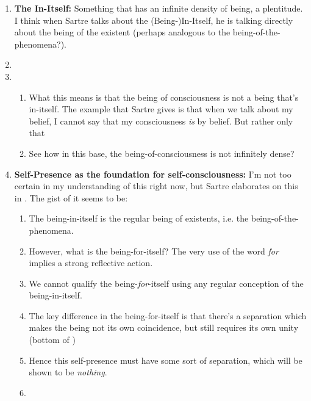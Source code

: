 \begin{enumerate}
  \item \textbf{The In-Itself:} Something that has an infinite density of being, a plentitude. I think when Sartre talks about the (Being-)In-Itself, he is talking directly about the being of the existent (perhaps analogous to the being-of-the-phenomena?).
  \item {}
  \item {}
  \begin{enumerate}
    \item What this means is that the being of consciousness is not a being that's in-itself. The example that Sartre gives is that when we talk about my belief, I cannot say that my consciousness \emph{is} by belief. But rather only that 
    \item See how in this base, the being-of-consciousness is not infinitely dense?
  \end{enumerate}
  \item \textbf{Self-Presence as the foundation for self-consciousness:} I'm not too certain in my understanding of this right now, but Sartre elaborates on this in \autocite[126]{sartre}. The gist of it seems to be:
  \begin{enumerate}
    \item The being-in-itself is the regular being of existents, i.e. the being-of-the-phenomena.
    \item However, what is the being-for-itself? The very use of the word \emph{for} implies a strong reflective action.
    \item We cannot qualify the being-\emph{for}-itself using any regular conception of the being-in-itself.
    \item The key difference in the being-for-itself is that there's a separation which makes the being not its own coincidence, but still requires its own unity (bottom of \autocite[126]{sartre})
    \item Hence this self-presence must have some sort of separation, which will be shown to be \emph{nothing}.
    \item {}

\end{enumerate}
\end{enumerate}
